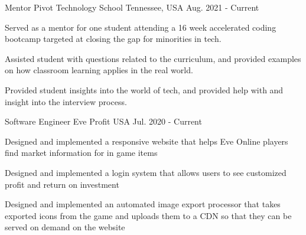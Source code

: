 

\begin{cventries}

  \cventry
    {Mentor} %
    {Pivot Technology School} %
    {Tennessee, USA} %
    {Aug. 2021 - Current} %
    {
      \begin{cvitems} %
        \item {Served as a mentor for one student attending a 16 week accelerated coding bootcamp targeted at closing the gap for minorities in tech.}
        \item {Assisted student with questions related to the curriculum, and provided examples on how classroom learning applies in the real world.}
        \item {Provided student insights into the world of tech, and provided help with and insight into the interview process.}
      \end{cvitems}
    }

  \cventry
    {Software Engineer} %
    {Eve Profit} %
    {USA} %
    {Jul. 2020 - Current} %
    {
      \begin{cvitems} %
        \item {Designed and implemented a responsive website that helps Eve Online players find market information for in game items}
        \item {Designed and implemented a login system that allows users to see customized profit and return on investment}
        \item {Designed and implemented an automated image export processor that takes exported icons from the game and uploads them to a CDN so that they can be served on demand on the website}
      \end{cvitems}
    }


\end{cventries}
